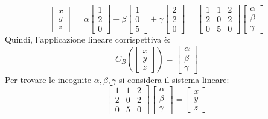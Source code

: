 \documentclass[a4paper]{article}
\begin{document}
	\begin{equation*}
		\begin{bmatrix}
			x \\
			y \\
			z
		\end{bmatrix} = \alpha \begin{bmatrix}
			1 \\
			2 \\
			0
		\end{bmatrix} + \beta \begin{bmatrix}
			1 \\
			0 \\
			5
		\end{bmatrix} + \gamma \begin{bmatrix}
			2 \\
			2 \\
			0
		\end{bmatrix} = \begin{bmatrix}
			1 & 1 & 2 \\
			2 & 0 & 2 \\
			0 & 5 & 0
		\end{bmatrix} \begin{bmatrix}
			\alpha \\
			\beta \\
			\gamma
		\end{bmatrix}
	\end{equation*}
	Quindi, l'applicazione lineare corrispettiva è:
	\begin{equation*}
		C_{B}\left(\begin{bmatrix}
			x \\
			y \\
			z
		\end{bmatrix}\right) = \begin{bmatrix}
			\alpha \\
			\beta \\
			\gamma
		\end{bmatrix}
	\end{equation*}
	Per trovare le incognite $\alpha, \beta, \gamma$ si considera il sistema lineare:
	\begin{equation*}
		\begin{bmatrix}
			1 & 1 & 2 \\
			2 & 0 & 2 \\
			0 & 5 & 0
		\end{bmatrix} \begin{bmatrix}
			\alpha \\
			\beta \\
			\gamma
		\end{bmatrix} = \begin{bmatrix}
			x \\
			y \\
			z
		\end{bmatrix}
	\end{equation*}
\end{document}
